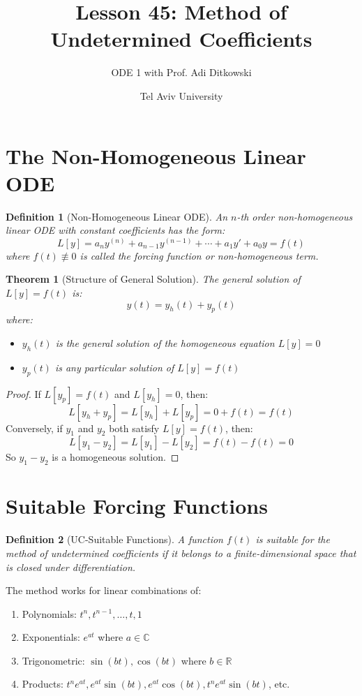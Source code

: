 \documentclass[12pt]{article}
\title{Lesson 45: Method of Undetermined Coefficients}
\author{ODE 1 with Prof. Adi Ditkowski}
\date{Tel Aviv University}
\newtheorem{definition}{Definition}
\newtheorem{theorem}{Theorem}
\begin{document}
\maketitle

\section{The Non-Homogeneous Linear ODE}

\begin{definition}[Non-Homogeneous Linear ODE]
An $n$-th order non-homogeneous linear ODE with constant coefficients has the form:
$$L[y] = a_n y^{(n)} + a_{n-1} y^{(n-1)} + \cdots + a_1 y' + a_0 y = f(t)$$
where $f(t) \not\equiv 0$ is called the forcing function or non-homogeneous term.
\end{definition}

\begin{theorem}[Structure of General Solution]
The general solution of $L[y] = f(t)$ is:
$$y(t) = y_h(t) + y_p(t)$$
where:
\begin{itemize}
    \item $y_h(t)$ is the general solution of the homogeneous equation $L[y] = 0$
    \item $y_p(t)$ is any particular solution of $L[y] = f(t)$
\end{itemize}
\end{theorem}

\begin{proof}
If $L[y_p] = f(t)$ and $L[y_h] = 0$, then:
$$L[y_h + y_p] = L[y_h] + L[y_p] = 0 + f(t) = f(t)$$
Conversely, if $y_1$ and $y_2$ both satisfy $L[y] = f(t)$, then:
$$L[y_1 - y_2] = L[y_1] - L[y_2] = f(t) - f(t) = 0$$
So $y_1 - y_2$ is a homogeneous solution.
\end{proof}

\section{Suitable Forcing Functions}

\begin{definition}[UC-Suitable Functions]
A function $f(t)$ is suitable for the method of undetermined coefficients if it belongs to a finite-dimensional space that is closed under differentiation.
\end{definition}

\begin{keypoint}
The method works for linear combinations of:
\begin{enumerate}
    \item Polynomials: $t^n, t^{n-1}, \ldots, t, 1$
    \item Exponentials: $e^{at}$ where $a \in \mathbb{C}$
    \item Trigonometric: $\sin(bt), \cos(bt)$ where $b \in \mathbb{R}$
    \item Products: $t^n e^{at}, e^{at}\sin(bt), e^{at}\cos(bt), t^n e^{at}\sin(bt)$, etc.
\end{enumerate}
\end{keypoint}
\end{document}
